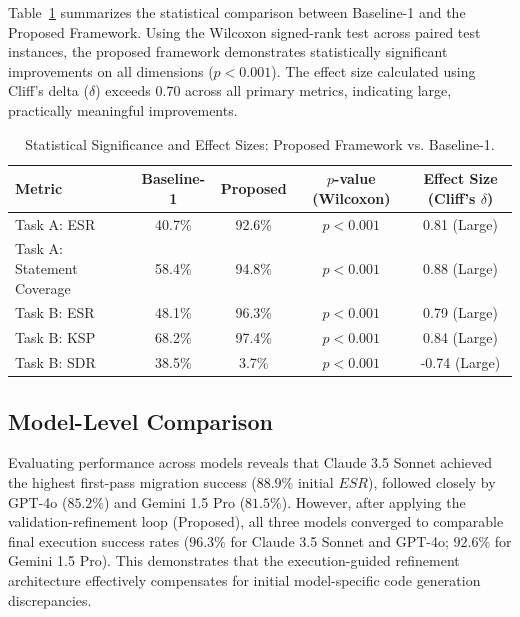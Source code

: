 \documentclass[pdflatex,sn-mathphys-num]{sn-jnl}
\begin{document}
Table~\ref{tab:ablation-summary} summarizes the statistical comparison between
Baseline-1 and the Proposed Framework. Using the Wilcoxon signed-rank test across
paired test instances, the proposed framework demonstrates statistically significant
improvements on all dimensions ($p < 0.001$). The effect size calculated using
Cliff's delta ($\delta$) exceeds $0.70$ across all primary metrics, indicating
large, practically meaningful improvements.

\begin{table}[t]
\centering
\caption{Statistical Significance and Effect Sizes: Proposed Framework vs. Baseline-1.}
\label{tab:ablation-summary}
\small
\begin{tabular}{lcccc}
\toprule
\textbf{Metric} & \textbf{Baseline-1} & \textbf{Proposed} & \textbf{$p$-value (Wilcoxon)} & \textbf{Effect Size (Cliff's $\delta$)} \\
\midrule
Task A: ESR & 40.7\% & 92.6\% & $p < 0.001$ & 0.81 (Large) \\
Task A: Statement Coverage & 58.4\% & 94.8\% & $p < 0.001$ & 0.88 (Large) \\
Task B: ESR & 48.1\% & 96.3\% & $p < 0.001$ & 0.79 (Large) \\
Task B: KSP & 68.2\% & 97.4\% & $p < 0.001$ & 0.84 (Large) \\
Task B: SDR & 38.5\% & 3.7\% & $p < 0.001$ & -0.74 (Large) \\
\bottomrule
\end{tabular}
\end{table}

\subsection{Model-Level Comparison}
\label{subsec:model-comparison}

Evaluating performance across models reveals that Claude 3.5 Sonnet achieved the highest
first-pass migration success ($88.9\%$ initial $ESR$), followed closely by GPT-4o
($85.2\%$) and Gemini 1.5 Pro ($81.5\%$). However, after applying the validation-refinement
loop (Proposed), all three models converged to comparable final execution success
rates ($96.3\%$ for Claude 3.5 Sonnet and GPT-4o; $92.6\%$ for Gemini 1.5 Pro). This
demonstrates that the execution-guided refinement architecture effectively compensates
for initial model-specific code generation discrepancies.

\end{document}
